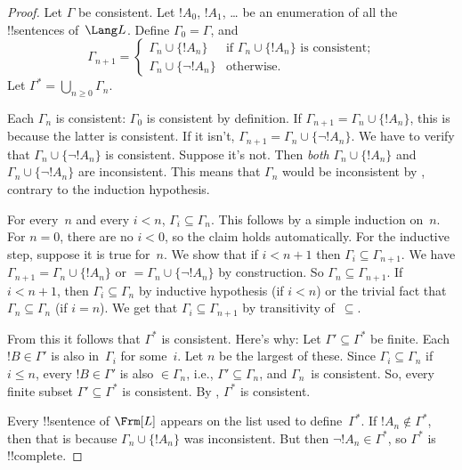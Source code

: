 \documentclass[../../../include/open-logic-section]{subfiles}
\begin{document}
\begin{proof}
Let $\Gamma$ be consistent.  Let $!A_0$, $!A_1$,
\dots{} be an enumeration of all the !!{sentence}s of~$\Lang L$.
Define $\Gamma_0 = \Gamma$, and
\[
\Gamma_{n+1} =
\begin{cases}
\Gamma_n \cup \{ !A_n \} & \textrm{if $\Gamma_n \cup \{!A_n\}$ is
  consistent;} \\
\Gamma_n \cup \{ \lnot !A_n \} & \textrm{otherwise.}
\end{cases}
\]
Let $\Gamma^* = \bigcup_{n \geq 0} \Gamma_n$.

Each $\Gamma_n$ is consistent: $\Gamma_0$ is consistent by definition.
If $\Gamma_{n+1} = \Gamma_n \cup \{!A_n\}$, this is because the latter
is consistent.  If it isn't, $\Gamma_{n+1} = \Gamma_n \cup \{\lnot
!A_n\}$. We have to verify that $\Gamma_n \cup \{\lnot !A_n\}$ is
consistent. Suppose it's not. Then \emph{both} $\Gamma_n \cup
\{!A_n\}$ and $\Gamma_n \cup \{\lnot !A_n\}$ are inconsistent.  This
means that $\Gamma_n$ would be inconsistent by
,
contrary to the induction hypothesis.

For every~$n$ and every $i < n$, $\Gamma_i \subseteq \Gamma_n$. This
follows by a simple induction on~$n$. For $n=0$, there are no $i < 0$,
so the claim holds automatically.  For the inductive step, suppose it
is true for~$n$. We show that if $i < n+1$ then $\Gamma_i \subseteq
\Gamma_{n+1}$. We have $\Gamma_{n+1} = \Gamma_n \cup \{!A_n\}$ or $=
\Gamma_n \cup \{\lnot !A_n\}$ by construction. So $\Gamma_n \subseteq
\Gamma_{n+1}$. If $i < n+1$, then $\Gamma_i \subseteq \Gamma_n$ by
inductive hypothesis (if $i < n$) or the trivial fact that $\Gamma_n
\subseteq \Gamma_n$ (if $i = n$). We get that $\Gamma_i \subseteq
\Gamma_{n+1}$ by transitivity of~$\subseteq$.

From this it follows that $\Gamma^*$ is consistent. Here's why: Let
$\Gamma' \subseteq \Gamma^*$ be finite. Each $!B \in \Gamma'$ is also
in~$\Gamma_i$ for some~$i$. Let $n$ be the largest of these. Since
$\Gamma_i \subseteq \Gamma_n$ if $i \le n$, every $!B \in \Gamma'$ is
also $\in \Gamma_n$, i.e., $\Gamma' \subseteq \Gamma_n$, and
$\Gamma_n$~is consistent. So, every finite subset $\Gamma' \subseteq
\Gamma^*$ is consistent. By , $\Gamma^*$ is
  consistent.

Every !!{sentence} of $\Frm[L]$ appears on the list used to
define~$\Gamma^*$. If $!A_n \notin \Gamma^*$, then that is because
$\Gamma_n \cup \{!A_n\}$ was inconsistent.  But then $\lnot !A_n
\in \Gamma^*$, so $\Gamma^*$ is !!{complete}.
\end{proof}
\end{document}
